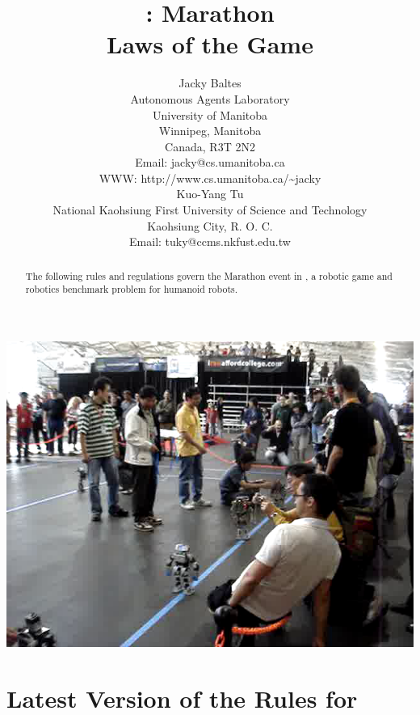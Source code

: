 \documentclass[12pt]{hurocup}
\begin{document}
\title{\HuroCup: Marathon\\
  Laws of the Game \thisyear}


\author{Jacky Baltes\\
Autonomous Agents Laboratory\\
University of Manitoba\\
Winnipeg, Manitoba\\
Canada, R3T 2N2\\
Email: jacky@cs.umanitoba.ca\\
WWW: http://www.cs.umanitoba.ca/\~{ }jacky\\[5mm]
Kuo-Yang Tu\\
National Kaohsiung First University of Science and Technology\\
Kaohsiung City, R. O. C.\\
Email: tuky@ccms.nkfust.edu.tw\\
}

\maketitle

\begin{center}
 \includegraphics[width=0.7\linewidth]{Figures/marathon-life}
\end{center}

\begin{abstract}
The following rules and regulations govern the Marathon event in
\HuroCup, a robotic game and robotics benchmark problem for humanoid
robots.
%
\end{abstract}

\section*{Latest Version of the Rules for \HuroCup}
\label{sec:updates}
\end{document}
